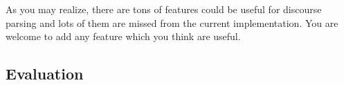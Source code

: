 \documentclass[12pt]{article}
\begin{document}
As you may realize, there are tons of features could be useful for discourse parsing \cite{Feng:12:Text,Joty:13:Comb} and lots of them are missed from the current implementation. You are welcome to add any feature which you think are useful. 

\subsection{Evaluation}



\end{document}
